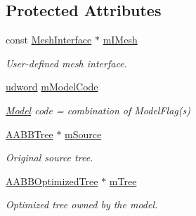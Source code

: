 \subsection*{Protected Attributes}
\begin{DoxyCompactItemize}
\item 
const \hyperlink{classOpcode_1_1MeshInterface}{Mesh\+Interface} $\ast$ \hyperlink{classOpcode_1_1BaseModel_a58f02b40e912e82e7e6eaec8d3b7e149}{m\+I\+Mesh}\hypertarget{classOpcode_1_1BaseModel_a58f02b40e912e82e7e6eaec8d3b7e149}{}\label{classOpcode_1_1BaseModel_a58f02b40e912e82e7e6eaec8d3b7e149}

\begin{DoxyCompactList}\small\item\em User-\/defined mesh interface. \end{DoxyCompactList}\item 
\hyperlink{IceTypes_8h_a44c6f1920ba5551225fb534f9d1a1733}{udword} \hyperlink{classOpcode_1_1BaseModel_af2b7c0654a8277bb69a8ea6e01a95633}{m\+Model\+Code}\hypertarget{classOpcode_1_1BaseModel_af2b7c0654a8277bb69a8ea6e01a95633}{}\label{classOpcode_1_1BaseModel_af2b7c0654a8277bb69a8ea6e01a95633}

\begin{DoxyCompactList}\small\item\em \hyperlink{classOpcode_1_1Model}{Model} code = combination of Model\+Flag(s) \end{DoxyCompactList}\item 
\hyperlink{classOpcode_1_1AABBTree}{A\+A\+B\+B\+Tree} $\ast$ \hyperlink{classOpcode_1_1BaseModel_a2f93fda5039493fadf8970ce77abd1aa}{m\+Source}\hypertarget{classOpcode_1_1BaseModel_a2f93fda5039493fadf8970ce77abd1aa}{}\label{classOpcode_1_1BaseModel_a2f93fda5039493fadf8970ce77abd1aa}

\begin{DoxyCompactList}\small\item\em Original source tree. \end{DoxyCompactList}\item 
\hyperlink{classOpcode_1_1AABBOptimizedTree}{A\+A\+B\+B\+Optimized\+Tree} $\ast$ \hyperlink{classOpcode_1_1BaseModel_ac36630432be5c38debbd9240ce04b154}{m\+Tree}\hypertarget{classOpcode_1_1BaseModel_ac36630432be5c38debbd9240ce04b154}{}\label{classOpcode_1_1BaseModel_ac36630432be5c38debbd9240ce04b154}

\begin{DoxyCompactList}\small\item\em Optimized tree owned by the model. \end{DoxyCompactList}\end{DoxyCompactItemize}


